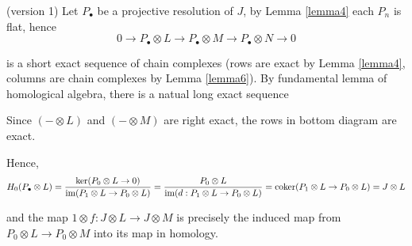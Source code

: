 \begin{longproof}
	(version 1) Let $P_\bullet$ be a projective resolution of $J$, by Lemma \ref{lemma4} each $P_n$ is flat, hence
	$$
		0 \to P_\bullet \otimes L \to P_\bullet \otimes M \to P_\bullet \otimes N \to 0
	$$
	
	is a short exact sequence of chain complexes (rows are exact by Lemma \ref{lemma4}, columns are chain complexes by Lemma \ref{lemma6}). By fundamental lemma of homological algebra, there is a natual long exact sequence
	\begin{center}
	\end{center}
	
	Since $(- \otimes L)$ and $(- \otimes M)$ are right exact, the rows in bottom diagram are exact.
	\begin{center}
	\end{center}
	
	Hence,
	$$
		H_0(P_\bullet \otimes L) = \frac{\ker (P_0 \otimes L \to 0)}{\operatorname{im} (P_1 \otimes L \to P_0 \otimes L)} = \frac{P_0 \otimes L}{\operatorname{im} (d: P_1 \otimes L \to P_0 \otimes L)} = \operatorname{coker} (P_1 \otimes L \to P_0 \otimes L) = J \otimes L
	$$
	
	and the map $1 \otimes f: J \otimes L \to J \otimes M$ is precisely the induced map from $P_0 \otimes L \to P_0 \otimes M$ into its map in homology.
	

\end{longproof}
